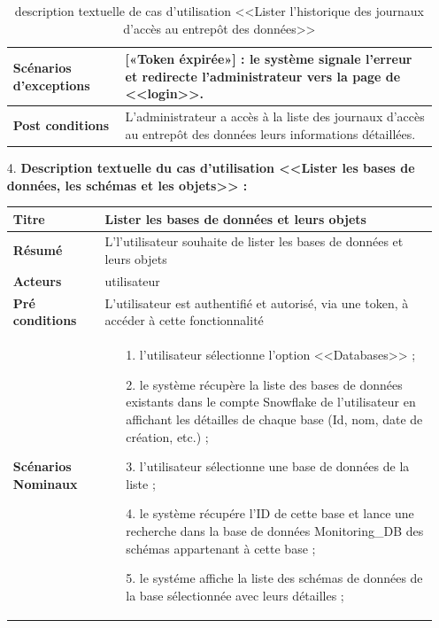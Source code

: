 \begin{enumerate}
\begin{table}[H]
\begin{tabular}{|p{3.5cm}|p{12cm}|}
            \hline  \textbf{Scénarios d'exceptions} & 
              [«Token éxpirée»] : le système signale l'erreur et redirecte l'administrateur vers la page de <<login>>.\\
            \hline \textbf{Post conditions} & L'administrateur a accès à la liste des journaux d'accès au entrepôt des données leurs informations détaillées.\\
            \hline 
        \end{tabular}
        \caption{description textuelle de cas d'utilisation <<Lister l'historique des journaux d'accès au entrepôt des données>>}
        \end{table}
        
        \item[4.] \textbf{Description textuelle du cas d'utilisation <<Lister les bases de données, les schémas et les objets>> :}
    \begin{table}[H]
        \centering
        \begin{tabular}{|p{3.5cm}|p{12cm}|}
            \hline \textbf{Titre} &  Lister les bases de données et leurs objets\\
            \hline \textbf{Résumé} & L'l'utilisateur souhaite de lister les bases de données et leurs objets \\
            \hline \textbf{Acteurs} & utilisateur \\
            \hline \textbf{Pré conditions }& L'utilisateur est authentifié et autorisé, via une token, à accéder à cette fonctionnalité\\
            \hline \textbf{Scénarios Nominaux} &
                \begin{enumerate}
                    \item [1.] l'utilisateur sélectionne l'option <<Databases>> ;
                    \item [2.] le système récupère la liste des bases de données existants dans le compte Snowflake de l'utilisateur en affichant les détailles de chaque base (Id, nom, date de création, etc.) ;
                    \item [3.] l'utilisateur sélectionne une base de données de la liste ;
                    \item [4.] le système récupére l'ID de cette base et lance une recherche dans la base de données Monitoring\_DB des schémas appartenant à cette base ;
                    \item [5.] le systéme affiche la liste des schémas de données de la base sélectionnée avec leurs détailles ;

\end{enumerate}
\end{tabular}
\end{table}
\end{enumerate}
